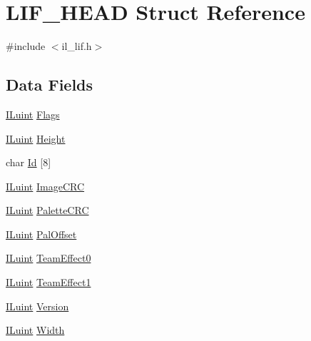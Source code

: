 \hypertarget{struct_l_i_f___h_e_a_d}{\section{L\-I\-F\-\_\-\-H\-E\-A\-D Struct Reference}
\label{struct_l_i_f___h_e_a_d}
}


{\ttfamily \#include $<$il\-\_\-lif.\-h$>$}

\subsection*{Data Fields}
\begin{DoxyCompactItemize}
\item 
\hyperlink{il_8h_ac6508d0e9c19e32f32e00d54b5b8cf30}{I\-Luint} \hyperlink{struct_l_i_f___h_e_a_d_ad5c4db01d6ffdff05862b7052afa79fc}{Flags}
\item 
\hyperlink{il_8h_ac6508d0e9c19e32f32e00d54b5b8cf30}{I\-Luint} \hyperlink{struct_l_i_f___h_e_a_d_a8a8093d76b61a95fc96df24af29b107a}{Height}
\item 
char \hyperlink{struct_l_i_f___h_e_a_d_ac9903881192f590d3b8d77fcc28a995d}{Id} \mbox{[}8\mbox{]}
\item 
\hyperlink{il_8h_ac6508d0e9c19e32f32e00d54b5b8cf30}{I\-Luint} \hyperlink{struct_l_i_f___h_e_a_d_a05c2c6c5e91ebe0fcc45a9760db4c8ab}{Image\-C\-R\-C}
\item 
\hyperlink{il_8h_ac6508d0e9c19e32f32e00d54b5b8cf30}{I\-Luint} \hyperlink{struct_l_i_f___h_e_a_d_ad9f60a434484261f832b08aba843883a}{Palette\-C\-R\-C}
\item 
\hyperlink{il_8h_ac6508d0e9c19e32f32e00d54b5b8cf30}{I\-Luint} \hyperlink{struct_l_i_f___h_e_a_d_a389d833c38d23cd69719c6deefe9797a}{Pal\-Offset}
\item 
\hyperlink{il_8h_ac6508d0e9c19e32f32e00d54b5b8cf30}{I\-Luint} \hyperlink{struct_l_i_f___h_e_a_d_a539d8f7bb2feca1f485934ec8d2157aa}{Team\-Effect0}
\item 
\hyperlink{il_8h_ac6508d0e9c19e32f32e00d54b5b8cf30}{I\-Luint} \hyperlink{struct_l_i_f___h_e_a_d_ae42acacdcc183dd53578e33b34bbbfc6}{Team\-Effect1}
\item 
\hyperlink{il_8h_ac6508d0e9c19e32f32e00d54b5b8cf30}{I\-Luint} \hyperlink{struct_l_i_f___h_e_a_d_ace8731875025335038f754ff027b835a}{Version}
\item 
\hyperlink{il_8h_ac6508d0e9c19e32f32e00d54b5b8cf30}{I\-Luint} \hyperlink{struct_l_i_f___h_e_a_d_a4146e7b2b0b4097e0e335f9b348392bf}{Width}
\end{DoxyCompactItemize}



